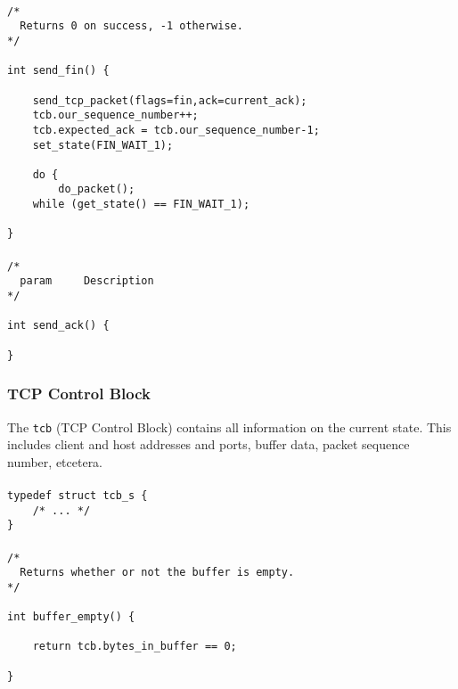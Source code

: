 \documentclass[11pt]{article}
\begin{document}
\paragraph{}


\begin{lstlisting}[title=Procedure send\_fin]
/*
  Returns 0 on success, -1 otherwise.
*/

int send_fin() {

    send_tcp_packet(flags=fin,ack=current_ack);
    tcb.our_sequence_number++;
    tcb.expected_ack = tcb.our_sequence_number-1;
    set_state(FIN_WAIT_1);

    do {
        do_packet();
    while (get_state() == FIN_WAIT_1);

}
\end{lstlisting}


\paragraph{}


\begin{lstlisting}[title=Procedure send\_ack]
/*
  param     Description
*/

int send_ack() {

}
\end{lstlisting}


\subsubsection{TCP Control Block}


The \verb|tcb| (TCP Control Block) contains all information on the
current state. This includes client and host addresses and ports, buffer
data, packet sequence number, etcetera.


\paragraph{}


\begin{lstlisting}[title=The TCP Control Block structure]
typedef struct tcb_s {
    /* ... */
}
\end{lstlisting}


\paragraph{}


\begin{lstlisting}[title=Procedure buffer\_empty]
/*
  Returns whether or not the buffer is empty.
*/

int buffer_empty() {

    return tcb.bytes_in_buffer == 0;

}
\end{lstlisting}
\end{document}
